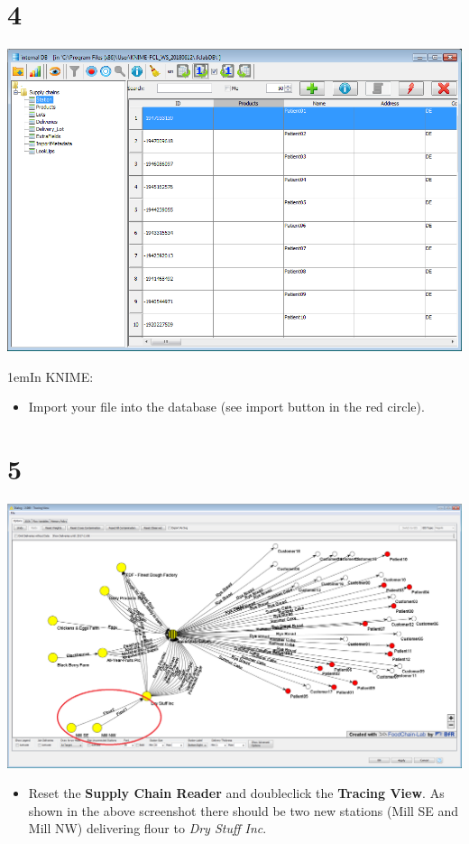 \documentclass[10pt]{beamer}
\begin{document}
\section{4}
\begin{frame}
	\begin{center}
			\includegraphics[height=0.6\textheight]{4.png}
	\end{center}
\leftskip1em{In KNIME:}
	\begin{itemize}
		\item Import your file into the database (see import button in the red circle).
	\end{itemize}
\end{frame}

\section{5}
\begin{frame}
	\begin{center}
			\includegraphics[height=0.6\textheight]{5.png}
	\end{center}
	\begin{itemize}
		\item Reset the \textbf{Supply Chain Reader} and doubleclick the \textbf{Tracing View}. As shown in the above screenshot there should be two new stations (Mill SE and Mill NW) delivering flour to \textit{Dry Stuff Inc}.
	\end{itemize}
\end{frame}
\end{document}
